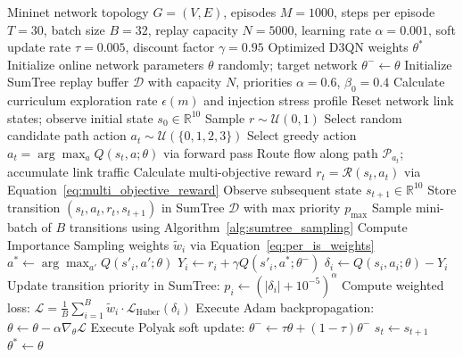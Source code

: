 \documentclass[12pt,a4paper,oneside]{report}
\begin{document}
\begin{algorithm}[htbp]
\caption{Complete D3QN-PER Adaptive Traffic Engineering Training Pipeline}
\label{alg:d3qn_complete_loop}
\begin{algorithmic}[1]
\REQUIRE Mininet network topology $G = (V, E)$, episodes $M = 1000$, steps per episode $T = 30$, batch size $B = 32$, replay capacity $N = 5000$, learning rate $\alpha = 0.001$, soft update rate $\tau = 0.005$, discount factor $\gamma = 0.95$
\ENSURE Optimized D3QN weights $\theta^*$
\STATE Initialize online network parameters $\theta$ randomly; target network $\theta^- \gets \theta$
\STATE Initialize SumTree replay buffer $\mathcal{D}$ with capacity $N$, priorities $\alpha = 0.6$, $\beta_0 = 0.4$
    \STATE Calculate curriculum exploration rate $\epsilon(m)$ and injection stress profile
    \STATE Reset network link states; observe initial state $s_0 \in \mathbb{R}^{10}$
        \STATE Sample $r \sim \mathcal{U}(0, 1)$
            \STATE Select random candidate path action $a_t \sim \mathcal{U}(\{0, 1, 2, 3\})$
        \ELSE
            \STATE Select greedy action $a_t = \arg\max_{a} Q(s_t, a; \theta)$ via forward pass
        \ENDIF
        \STATE Route flow along path $\mathcal{P}_{a_t}$; accumulate link traffic
        \STATE Calculate multi-objective reward $r_t = \mathcal{R}(s_t, a_t)$ via Equation~\ref{eq:multi_objective_reward}
        \STATE Observe subsequent state $s_{t+1} \in \mathbb{R}^{10}$
        \STATE Store transition $(s_t, a_t, r_t, s_{t+1})$ in SumTree $\mathcal{D}$ with max priority $p_{\text{max}}$
            \STATE Sample mini-batch of $B$ transitions using Algorithm~\ref{alg:sumtree_sampling}
            \STATE Compute Importance Sampling weights $\tilde{w}_i$ via Equation~\ref{eq:per_is_weights}
                \STATE $a^* \gets \arg\max_{a'} Q(s'_{i}, a'; \theta)$ 
                \STATE $Y_i \gets r_i + \gamma Q(s'_{i}, a^*; \theta^-)$ 
                \STATE $\delta_i \gets Q(s_i, a_i; \theta) - Y_i$ 
                \STATE Update transition priority in SumTree: $p_i \gets (|\delta_i| + 10^{-5})^\alpha$
            \ENDFOR
            \STATE Compute weighted loss: $\mathcal{L} = \frac{1}{B}\sum_{i=1}^B \tilde{w}_i \cdot \mathcal{L}_{\text{Huber}}(\delta_i)$
            \STATE Execute Adam backpropagation: $\theta \gets \theta - \alpha \nabla_\theta \mathcal{L}$
            \STATE Execute Polyak soft update: $\theta^- \gets \tau \theta + (1 - \tau) \theta^-$
        \ENDIF
        \STATE $s_t \gets s_{t+1}$
    \ENDFOR
\ENDFOR
\RETURN $\theta^* \gets \theta$
\end{algorithmic}
\end{algorithm}
\end{document}
